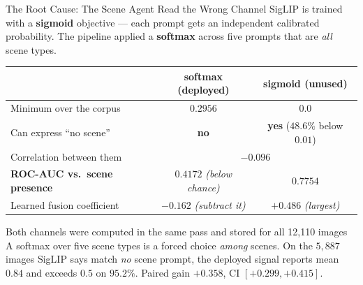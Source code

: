 \documentclass[aspectratio=169,11pt]{beamer}
\begin{document}
\begin{frame}{The Root Cause: The Scene Agent Read the Wrong Channel}
\small
SigLIP is trained with a \textbf{sigmoid} objective --- each prompt gets an independent calibrated probability. The pipeline applied a \textbf{softmax} across five prompts that are \emph{all} scene types.
\vspace{1mm}
\begin{center}
\scriptsize
\begin{tabular}{@{}l c c@{}}
\toprule
& \textbf{softmax (deployed)} & \textbf{sigmoid (unused)} \\
\midrule
Minimum over the corpus & $0.2956$ & $\mathbf{0.0}$ \\
Can express ``no scene'' & \textbf{no} & \textbf{yes} ($48.6\%$ below $0.01$) \\
Correlation between them & \multicolumn{2}{c}{$-0.096$} \\
\midrule
\textbf{ROC-AUC vs.\ scene presence} & $\mathbf{0.4172}$ \emph{(below chance)} & $\mathbf{0.7754}$ \\
Learned fusion coefficient & $-0.162$ \emph{(subtract it)} & $+0.486$ \emph{(largest)} \\
\bottomrule
\end{tabular}
\end{center}
\vspace{1mm}
\begin{alertblock}{\small Both channels were computed in the same pass and stored for all 12,110 images}
\footnotesize A softmax over five scene types is a forced choice \emph{among} scenes. On the $5{,}887$ images SigLIP says match \emph{no} scene prompt, the deployed signal reports mean $0.84$ and exceeds $0.5$ on $95.2\%$. Paired gain $+0.358$, CI $[+0.299,+0.415]$.
\end{alertblock}
\end{frame}
\end{document}
